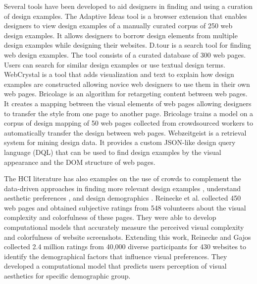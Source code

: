 Several tools have been developed to aid designers in finding and using a curation of design examples.
The Adaptive Ideas tool \cite{lee_2010_CHI} is a browser extension that enables designers to view design examples of a manually curated corpus of 250 web design examples.
It allows designers to borrow design elements from multiple design examples while designing their websites.
D.tour \cite{ritchie_2011_CHI} is a search tool for finding web design examples.
The tool consists of a curated database of 300 web pages.
Users can search for similar design examples or use textual design terms.
WebCrystal \cite{chang_2012_CHI} is a tool that adds visualization and text to explain how design examples are constructed allowing novice web designers to use them in their own web pages.
Bricolage \cite{kumar_2011_CHI} is an algorithm for retargeting content between web pages.
It creates a mapping between the visual elements of web pages allowing designers to transfer the style from one page to another page.
Bricolage trains a model on a corpus of design mapping of 50 web pages collected from crowdsourced workers to automatically transfer the design between web pages.
Webzeitgeist \cite{kumar_2013_CHI} is a retrieval system for mining design data.
It provides a custom JSON-like design query language (DQL) that can be used to find design examples by the visual appearance and the DOM structure of web pages.


The HCI literature has also examples on the use of crowds to complement the data-driven approaches in finding more relevant design examples \cite{kumar_2011_CHI, spirin_2014_WWW}, understand aesthetic preferences \cite{reinecke_2013_CHI}, and design demographics \cite{reinecke_2014_CHI}. 
Reinecke et al. \cite{reinecke_2013_CHI} collected 450 web pages and obtained subjective ratings from 548 volunteers about the visual complexity and colorfulness of these pages.
They were able to develop computational models that accurately measure the perceived visual complexity and colorfulness of website screenshots.
Extending this work, Reinecke and Gajos \cite{reinecke_2014_CHI} collected 2.4 million ratings from 40,000 diverse participants for 430 websites to identify the demographical factors that influence visual preferences. 
They developed a computational model that predicts users perception of visual aesthetics for specific demographic group.

